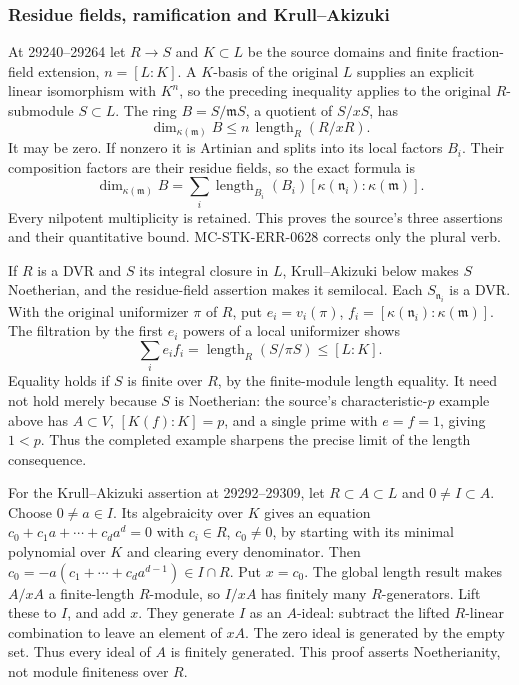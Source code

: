 \subsubsection{Residue fields, ramification and Krull--Akizuki}\label{algebra-proof-028-residue-fields-ramification-and-krullakizuki}

At 29240--29264 let \(R\to S\) and \(K\subset L\) be the source domains and finite fraction-field extension, \(n=[L:K]\). A \(K\)-basis of the original \(L\) supplies an explicit linear isomorphism with \(K^n\), so the preceding inequality applies to the original \(R\)-submodule \(S\subset L\). The ring \(B=S/\mathfrak mS\), a quotient of \(S/xS\), has \[
 \dim_{\kappa(\mathfrak m)}B
 \le n\,\operatorname{length}_R(R/xR).
\] It may be zero. If nonzero it is Artinian and splits into its local factors \(B_i\). Their composition factors are their residue fields, so the exact formula is \[
 \dim_{\kappa(\mathfrak m)}B
 =\sum_i \operatorname{length}_{B_i}(B_i)
          [\kappa(\mathfrak n_i):\kappa(\mathfrak m)].
\] Every nilpotent multiplicity is retained. This proves the source's three assertions and their quantitative bound. MC-STK-ERR-0628 corrects only the plural verb.

If \(R\) is a DVR and \(S\) its integral closure in \(L\), Krull--Akizuki below makes \(S\) Noetherian, and the residue-field assertion makes it semilocal. Each \(S_{\mathfrak n_i}\) is a DVR. With the original uniformizer \(\pi\) of \(R\), put \(e_i=v_i(\pi)\), \(f_i=[\kappa(\mathfrak n_i):\kappa(\mathfrak m)]\). The filtration by the first \(e_i\) powers of a local uniformizer shows \[
 \sum_i e_i f_i
 =\operatorname{length}_R(S/\pi S)\le [L:K].
\] Equality holds if \(S\) is finite over \(R\), by the finite-module length equality. It need not hold merely because \(S\) is Noetherian: the source's characteristic-\(p\) example above has \(A\subset V\), \([K(f):K]=p\), and a single prime with \(e=f=1\), giving \(1<p\). Thus the completed example sharpens the precise limit of the length consequence.

For the Krull--Akizuki assertion at 29292--29309, let \(R\subset A\subset L\) and \(0\ne I\subset A\). Choose \(0\ne a\in I\). Its algebraicity over \(K\) gives an equation \(c_0+c_1a+\cdots+c_da^d=0\) with \(c_i\in R\), \(c_0\ne0\), by starting with its minimal polynomial over \(K\) and clearing every denominator. Then \(c_0=-a(c_1+\cdots+c_da^{d-1})\in I\cap R\). Put \(x=c_0\). The global length result makes \(A/xA\) a finite-length \(R\)-module, so \(I/xA\) has finitely many \(R\)-generators. Lift these to \(I\), and add \(x\). They generate \(I\) as an \(A\)-ideal: subtract the lifted \(R\)-linear combination to leave an element of \(xA\). The zero ideal is generated by the empty set. Thus every ideal of \(A\) is finitely generated. This proof asserts Noetherianity, not module finiteness over \(R\).

